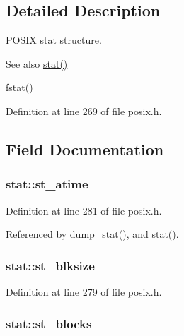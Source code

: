 \subsection{Detailed Description}
P\+O\+S\+IX stat structure. 

\begin{DoxySeeAlso}{See also}
\hyperlink{posix_8c_abef70bf7a4af8a1f4998db0035c51781}{stat()} 

\hyperlink{posix_8h_a85e86e70773c0a204346f965272bd364}{fstat()} 
\end{DoxySeeAlso}


Definition at line 269 of file posix.\+h.



\subsection{Field Documentation}
\subsubsection[{\texorpdfstring{st\+\_\+atime}{st_atime}}]{ stat\+::st\+\_\+atime}\hypertarget{structstat_ab74d1e7e345e88b9d0fb2688a97cba64}{}\label{structstat_ab74d1e7e345e88b9d0fb2688a97cba64}


Definition at line 281 of file posix.\+h.



Referenced by dump\+\_\+stat(), and stat().

\subsubsection[{\texorpdfstring{st\+\_\+blksize}{st_blksize}}]{ stat\+::st\+\_\+blksize}\hypertarget{structstat_a38d474e1ae3cf6fbdde89ac3c3e308f1}{}\label{structstat_a38d474e1ae3cf6fbdde89ac3c3e308f1}


Definition at line 279 of file posix.\+h.

\subsubsection[{\texorpdfstring{st\+\_\+blocks}{st_blocks}}]{ stat\+::st\+\_\+blocks}\hypertarget{structstat_a42dd716b2f9234f961d949fc9500eefb}{}\label{structstat_a42dd716b2f9234f961d949fc9500eefb}


